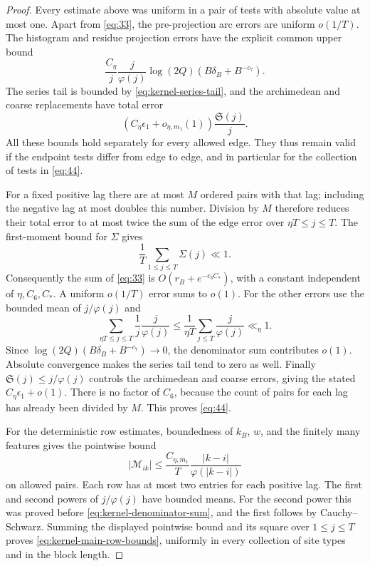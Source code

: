 \begin{proof}
Every estimate above was uniform in a pair of tests with absolute
value at most one.  Apart from \eqref{eq:33}, the pre-projection
arc errors are uniform \(o(1/T)\).  The histogram and residue
projection errors have the explicit common upper bound
\[
 \frac{C_\eta}{j}\frac j{\varphi(j)}\log(2Q)
                   (B\delta_B+B^{-c_7}).
\]
The series tail is bounded by \eqref{eq:kernel-series-tail}, and
the archimedean and coarse replacements have total error
\[
 \left(C_\eta\epsilon_1+o_{\eta,m_1}(1)\right)
                  \frac{\mathfrak S(j)}j.
\]
All these bounds hold separately for every allowed edge.  They
thus remain valid if the endpoint tests differ from edge to edge,
and in particular for the collection of tests in \eqref{eq:44}.

For a fixed positive lag there are at most \(M\) ordered pairs
with that lag; including the negative lag at most doubles this
number.  Division by \(M\) therefore reduces their total error
to at most twice the sum of the edge error over
\(\eta T\le j\le T\).  The first-moment bound for \(\Sigma\) gives
\[
 \frac1T\sum_{1\le j\le T}\Sigma(j)\ll1.
\]
Consequently the sum of \eqref{eq:33} is
\(O(r_B+e^{-c_3C_*})\), with a constant independent of
\(\eta,C_6,C_*\).  A uniform \(o(1/T)\) error sums to \(o(1)\).
For the other errors use the bounded mean of \(j/\varphi(j)\)
and
\[
 \sum_{\eta T\le j\le T}\frac1j\frac j{\varphi(j)}
 \le\frac1{\eta T}\sum_{j\le T}\frac j{\varphi(j)}
 \ll_\eta1.
\]
Since \(\log(2Q)(B\delta_B+B^{-c_7})\to0\), the denominator
sum contributes \(o(1)\).  Absolute convergence makes the series
tail tend to zero as well.  Finally
\(\mathfrak S(j)\le j/\varphi(j)\) controls the archimedean and
coarse errors, giving the stated \(C_\eta\epsilon_1+o(1)\).
There is no factor of \(C_6\), because the count of pairs for
each lag has already been divided by \(M\).  This proves
\eqref{eq:44}.

For the deterministic row estimates, boundedness of \(k_B\),
\(w\), and the finitely many features gives the pointwise bound
\[
 |\mathcal M_{ik}|
 \le\frac{C_{\eta,m_1}}T\frac{|k-i|}{\varphi(|k-i|)}
\]
on allowed pairs.  Each row has at most two entries for each
positive lag.  The first and second powers of \(j/\varphi(j)\)
have bounded means.  For the second power this was proved before
\eqref{eq:kernel-denominator-sum}, and the first follows by
Cauchy--Schwarz.  Summing the displayed pointwise bound and its
square over \(1\le j\le T\) proves
\eqref{eq:kernel-main-row-bounds}, uniformly in every collection
of site types and in the block length.
\end{proof}
